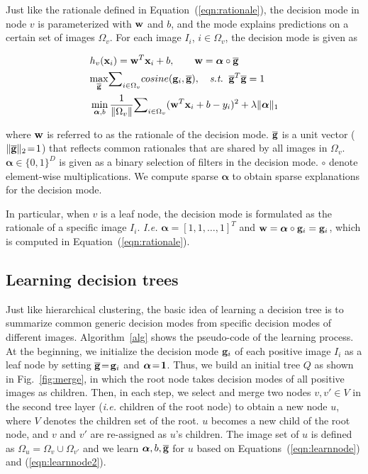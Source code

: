 \documentclass[10pt,twocolumn,letterpaper]{article}
\begin{document}
Just like the rationale defined in Equation~(\ref{eqn:rationale}), the decision mode in node $v$ is parameterized with ${\bf w}$ and $b$, and the mode explains predictions on a certain set of images {\small$\Omega_{v}$}. For each image {\small$I_{i}$}, {\small$i\in\Omega_{v}$}, the decision mode is given as
\begin{small}
\begin{eqnarray}
&h_{v}({\bf x}_{i})={\bf w}^{T}{\bf x}_{i}+b,\qquad {\bf w}={\boldsymbol\alpha}\circ\overline{\bf g}\\
&\underset{\overline{\bf g}}{\max}{\sum}_{i\in\Omega_{v}}cosine({\bf g}_{i},\overline{\bf g}),\quad\emph{s.t.}\;\;\overline{\bf g}^{T}\overline{\bf g}=1\label{eqn:learnnode}\\
&\min_{{\boldsymbol\alpha},b}\frac{1}{\Vert\Omega_{v}\Vert}{\sum}_{i\in\Omega_{v}}({\bf w}^{T}{\bf x}_{i}+b-y_{i})^2+\lambda\Vert{\boldsymbol\alpha}\Vert_1\label{eqn:learnnode2}
\end{eqnarray}
\end{small}
where ${\bf w}$ is referred to as the rationale of the decision mode. {\small$\overline{\bf g}$} is a unit vector ({\small$\Vert\overline{\bf g}\Vert_2\!=\!1$}) that reflects common rationales that are shared by all images in {\small$\Omega_{v}$}. ${\boldsymbol\alpha}\in\{0,1\}^{D}$ is given as a binary selection of filters in the decision mode. $\circ$ denote element-wise multiplications. We compute sparse ${\boldsymbol\alpha}$ to obtain sparse explanations for the decision mode\footnotemark[5].

In particular, when $v$ is a leaf node, the decision mode is formulated as the rationale of a specific image $I_{i}$. \emph{I.e.} ${\boldsymbol\alpha}=[1,1,\ldots,1]^{T}$ and {\small${\bf w}={\boldsymbol\alpha}\circ{\bf g}_{i}={\bf g}_{i}$}, which is computed in Equation~(\ref{eqn:rationale}).


\subsection{Learning decision trees}

Just like hierarchical clustering, the basic idea of learning a decision tree is to summarize common generic decision modes from specific decision modes of different images. Algorithm~\ref{alg} shows the pseudo-code of the learning process. At the beginning, we initialize the decision mode {\small${\bf g}_{i}$} of each positive image $I_{i}$ as a leaf node by setting {\small$\overline{\bf g}\!=\!{\bf g}_{i}$} and {\small${\boldsymbol\alpha}\!=\!{\bf 1}$}. Thus, we build an initial tree $Q$ as shown in Fig.~\ref{fig:merge}, in which the root node takes decision modes of all positive images as children. Then, in each step, we select and merge two nodes $v,v'\in V$ in the second tree layer (\emph{i.e.} children of the root node) to obtain a new node $u$, where $V$ denotes the children set of the root. $u$ becomes a new child of the root node, and $v$ and $v'$ are re-assigned as $u$'s children. The image set of $u$ is defined as {\small$\Omega_{u}=\Omega_{v}\cup\Omega_{v'}$} and we learn {\small${\boldsymbol\alpha},b,\overline{\bf g}$} for $u$ based on Equations~(\ref{eqn:learnnode}) and (\ref{eqn:learnnode2}).
\end{document}
